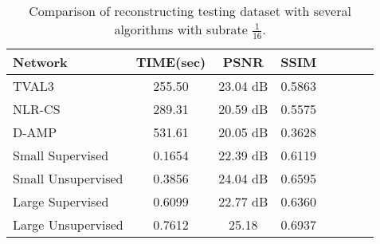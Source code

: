 \vspace{1.5cm}


\begin{table}[!htb]
\caption[Average time and quality metrics for testing dataset]{Comparison of reconstructing testing dataset with several algorithms with subrate $\frac{1}{16}$.}
\label{tab:summaryComp}
\begin{center}
\begin{tabular}{l*{6}{c}r}
Network              & TIME(sec) & PSNR & SSIM \\
\hline
TVAL3 & 255.50 & 23.04 dB & 0.5863\\
NLR-CS & 289.31 & 20.59 dB & 0.5575\\
D-AMP & 531.61 & 20.05 dB & 0.3628\\
Small Supervised   & 0.1654 & 22.39 dB & 0.6119\\
Small Unsupervised     & 0.3856 & 24.04 dB & 0.6595\\
Large Supervised & 0.6099 & 22.77 dB & 0.6360 \\
Large Unsupervised & 0.7612 & 25.18 & 0.6937\\
\bottomrule 
\end{tabular}%
\end{center}  
\end{table}

